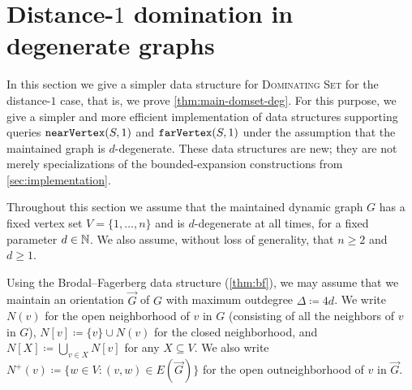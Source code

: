 \section{Distance-\texorpdfstring{$1$}{1} domination in degenerate graphs}\label{sec:distone}

In this section we give a simpler data structure for \textsc{Dominating Set} for the distance-$1$ case, that is, we prove \cref{thm:main-domset-deg}. For this purpose, we give a simpler and more efficient implementation of data structures supporting queries $\mathtt{nearVertex}(S,1)$ and $\mathtt{farVertex}(S,1)$ under the assumption that the maintained graph is $d$-degenerate. These data structures are new; they are not merely specializations of the bounded-expansion constructions from \cref{sec:implementation}. 

Throughout this section we assume that the maintained dynamic graph $G$ has a fixed vertex set $V=\{1,\ldots,n\}$ and is $d$-degenerate at all times, for a fixed parameter $d\in \mathbb{N}$. We also assume, without loss of generality, that $n\geq 2$ and $d\geq 1$.





Using the Brodal--Fagerberg data structure (\cref{thm:bf}), we may assume that we maintain an orientation $\vec{G}$ of $G$ with maximum outdegree $\Delta \coloneqq 4d$. 
We write $N(v)$ for the open neighborhood of $v$ in $G$ (consisting of all the neighbors of $v$ in $G$), $N[v]\coloneqq \{v\}\cup N(v)$ for the closed neighborhood, and $N[X]\coloneqq \bigcup_{v\in X}N[v]$ for any $X\subseteq V$. We also write $N^+(v)\coloneqq \{w\in V : (v,w)\in E(\vec G)\}$ for the open outneighborhood of $v$ in $\vec G$.

